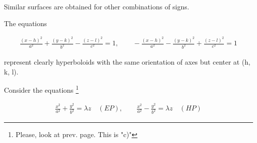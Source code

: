 \documentclass[11pt]{amsbook}
\begin{document}
Similar surfaces are obtained for other combinations of signs.

The equations

\begin{align*}
	\frac{(x-h)^2}{a^2} + \frac{(y-k)^2}{b^2} - \frac{(z-l)^2}{c^2} = 1, \qquad -\frac{(x-h)^2}{a^2} - \frac{(y-k)^2}{b^2} + \frac{(z-l)^2}{c^2} = 1
\end{align*}

\noindent represent clearly hyperboloids with the same orientation of axes but center at (h, k, l).\\

\begin{hEnumerateAlpha} 
	\item Consider the equations \footnote{Please, look at prev. page. This is "c)"}
\end{hEnumerateAlpha}
 
\begin{align*}
	\frac{x^2}{a^2} + \frac{y^2}{b^2} = \lambda z \quad (EP), \qquad \frac{x^2}{a^2} - \frac{y^2}{b^2} = \lambda z \quad (HP)
\end{align*}
\end{document}
